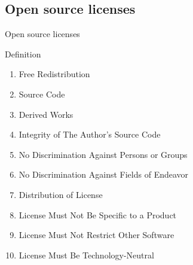 \documentclass[10pt,xcolor=svgnames]{beamer}
\begin{document}
\subsection{Open source licenses}
\begin{frame}{Open source licenses}

  \begin{block}{Definition}
    \begin{enumerate}
      \item Free Redistribution
      \item Source Code
      \item Derived Works
      \item Integrity of The Author's Source Code
      \item No Discrimination Against Persons or Groups
      \item No Discrimination Against Fields of Endeavor
      \item Distribution of License
      \item License Must Not Be Specific to a Product
      \item License Must Not Restrict Other Software
      \item License Must Be Technology-Neutral
    \end{enumerate}
  \end{block}
\end{frame}
\end{document}
